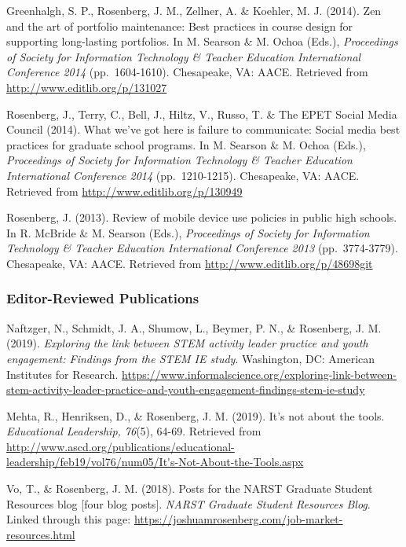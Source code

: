 \documentclass[14,]{article}
\begin{document}
Greenhalgh, S. P., Rosenberg, J. M., Zellner, A. \& Koehler, M. J.
(2014). Zen and the art of portfolio maintenance: Best practices in
course design for supporting long-lasting portfolios. In M. Searson \&
M. Ochoa (Eds.), \emph{Proceedings of Society for Information Technology
\& Teacher Education International Conference 2014} (pp.~1604-1610).
Chesapeake, VA: AACE. Retrieved from
\url{http://www.editlib.org/p/131027}

Rosenberg, J., Terry, C., Bell, J., Hiltz, V., Russo, T. \& The EPET
Social Media Council (2014). What we've got here is failure to
communicate: Social media best practices for graduate school programs.
In M. Searson \& M. Ochoa (Eds.), \emph{Proceedings of Society for
Information Technology \& Teacher Education International Conference
2014} (pp.~1210-1215). Chesapeake, VA: AACE. Retrieved from
\url{http://www.editlib.org/p/130949}

Rosenberg, J. (2013). Review of mobile device use policies in public
high schools. In R. McBride \& M. Searson (Eds.), \emph{Proceedings of
Society for Information Technology \& Teacher Education International
Conference 2013} (pp.~3774-3779). Chesapeake, VA: AACE. Retrieved from
\url{http://www.editlib.org/p/48698git}

\hypertarget{editor-reviewed-publications}{%
\subsubsection{Editor-Reviewed
Publications}\label{editor-reviewed-publications}}

Naftzger, N., Schmidt, J. A., Shumow, L., Beymer, P. N., \& Rosenberg,
J. M. (2019). \emph{Exploring the link between STEM activity leader
practice and youth engagement: Findings from the STEM IE study}.
Washington, DC: American Institutes for Research.
\url{https://www.informalscience.org/exploring-link-between-stem-activity-leader-practice-and-youth-engagement-findings-stem-ie-study}

Mehta, R., Henriksen, D., \& Rosenberg, J. M. (2019). It's not about the
tools. \emph{Educational Leadership, 76}(5), 64-69. Retrieved from
\url{http://www.ascd.org/publications/educational-leadership/feb19/vol76/num05/It's-Not-About-the-Tools.aspx}

Vo, T., \& Rosenberg, J. M. (2018). Posts for the NARST Graduate Student
Resources blog {[}four blog posts{]}. \emph{NARST Graduate Student
Resources Blog}. Linked through this page:
\url{https://joshuamrosenberg.com/job-market-resources.html}
\end{document}
